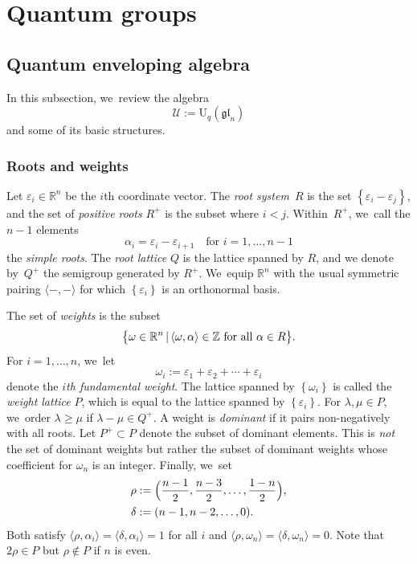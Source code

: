 \documentclass[JEP,XML,SOM,Unicode,published]{cedram}
\let\epsilon\varepsilon
\newcommand{\rU}{\mathrm{U}}
\theoremstyle{definition}
\newcommand{\RR}{\mathbb{R}}
\newcommand{\ZZ}{\mathbb{Z}}
\newcommand{\gl}{\mathfrak{gl}}
\begin{document}
\section{Quantum groups}

\subsection{Quantum enveloping algebra}
In this subsection, we~review the algebra
\[
\mathcal{U}:=\rU_q(\gl_n)
\]
and some of its basic structures.

\subsubsection{Roots and weights}
Let $\epsilon_i\in \RR^n$ be the $i$th coordinate vector.
The \textit{root system}~$R$ is the set $\left\{ \epsilon_i-\epsilon_j \right\}$, and the set of \textit{positive roots} $R^+$ is the subset where $i<j$.
Within~$R^+$, we~call the $n-1$ elements
\[
\alpha_i=\epsilon_i-\epsilon_{i+1}\quad\text{for }i=1,\ldots, n-1
\]
the \textit{simple roots}.
The \textit{root lattice} $Q$ is the lattice spanned by $R$, and we denote by~$Q^+$ the semigroup generated by $R^+$. We~equip $\RR^n$ with the usual symmetric pairing $\langle-,-\rangle$ for which $\left\{ \epsilon_i \right\}$ is an orthonormal basis.

The set of \textit{weights} is the subset
\[
\bigl\{ \omega\in\RR^n\, |\, \langle\omega,\alpha\rangle\in\ZZ\hbox{ for all }\alpha\in R \bigr\}.
\]
For $i=1,\ldots, n$, we~let
\[
\omega_i:=\epsilon_1+\epsilon_2+\cdots+\epsilon_i
\]
denote the \textit{$i$th fundamental weight}.
The lattice spanned by $\left\{ \omega_i \right\}$ is called the \textit{weight lattice} $P$, which is equal to the lattice spanned by $\left\{ \epsilon_i \right\}$.
For $\lambda, \mu\in P$, we~order $\lambda\ge\mu$ if $\lambda-\mu\in Q^+$.
A weight is \textit{dominant} if it pairs non-negatively with all roots.
Let $P^+\subset P$ denote the subset of dominant elements.
This is \textit{not} the set of dominant weights but rather the subset of dominant weights whose coefficient for $\omega_n$ is an integer.
Finally, we~set
\begin{align*}
\rho&:=\Bigl(\frac{n-1}{2}, \frac{n-3}{2},\ldots,\frac{1-n}{2} \Bigr),\\
\delta&:=(n-1, n-2,\ldots, 0).
\end{align*}
Both satisfy $\langle\rho, \alpha_i\rangle =\langle\delta,\alpha_i\rangle=1$ for all $i$ and $\langle\rho,\omega_n\rangle=\langle \delta,\omega_n\rangle=0$.
Note that $2\rho\in P$ but $\rho\not\in P$ if $n$ is even.
\end{document}
